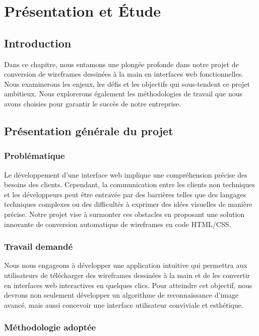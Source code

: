 \chapter{Présentation et Étude}


\section{Introduction}

Dans ce chapitre, nous entamons une plongée profonde dans notre projet de conversion de wireframes dessinées à la main en interfaces web fonctionnelles. Nous examinerons les enjeux, les défis et les objectifs qui sous-tendent ce projet ambitieux. Nous explorerons également les méthodologies de travail que nous avons choisies pour garantir le succès de notre entreprise.

\section{Présentation générale du projet}

\subsection{Problématique}

Le développement d'une interface web implique une compréhension précise des besoins des clients. Cependant, la communication entre les clients non techniques et les développeurs peut être entravée par des barrières telles que des langages techniques complexes ou des difficultés à exprimer des idées visuelles de manière précise. Notre projet vise à surmonter ces obstacles en proposant une solution innovante de conversion automatique de wireframes en code HTML/CSS.

\subsection{Travail demandé}

Nous nous engageons à développer une application intuitive qui permettra aux utilisateurs de télécharger des wireframes dessinées à la main et de les convertir en interfaces web interactives en quelques clics. Pour atteindre cet objectif, nous devrons non seulement développer un algorithme de reconnaissance d'image avancé, mais aussi concevoir une interface utilisateur conviviale et esthétique.

\subsection{Méthodologie adoptée}

